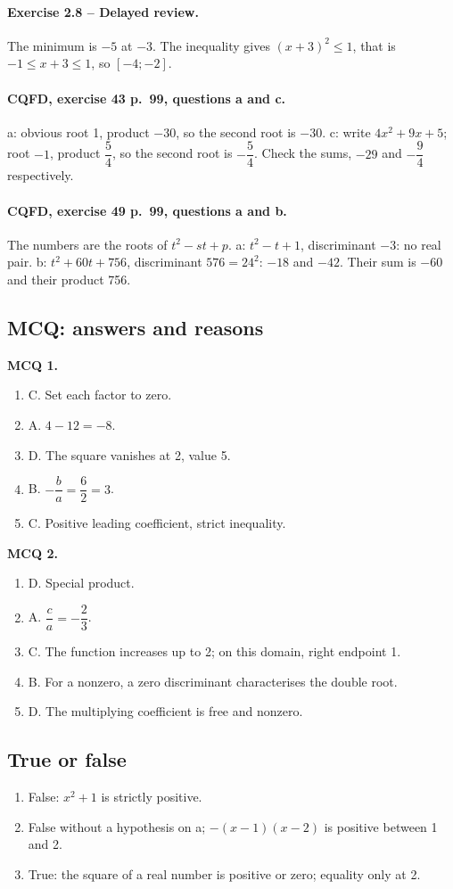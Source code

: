 \paragraph{Exercise 2.8 -- Delayed review.} The minimum is $-5$ at $-3$. The inequality gives $(x+3)^2\leq1$, that is $-1\leq x+3\leq1$, so $[-4;-2]$.
\paragraph{CQFD, exercise 43 p.~99, questions a and c.} a: obvious root 1, product $-30$, so the second root is $-30$. c: write $4x^2+9x+5$; root $-1$, product $\dfrac54$, so the second root is $-\dfrac54$. Check the sums, $-29$ and $-\dfrac94$ respectively.
\paragraph{CQFD, exercise 49 p.~99, questions a and b.} The numbers are the roots of $t^2-st+p$. a: $t^2-t+1$, discriminant $-3$: no real pair. b: $t^2+60t+756$, discriminant $576=24^2$: $-18$ and $-42$. Their sum is $-60$ and their product 756.
\subsection*{MCQ: answers and reasons}
\textbf{MCQ 1.}
\begin{enumerate}
\item C. Set each factor to zero.
\item A. $4-12=-8$.
\item D. The square vanishes at 2, value 5.
\item B. $-\dfrac{b}{a}=\dfrac{6}{2}=3$.
\item C. Positive leading coefficient, strict inequality.
\end{enumerate}
\textbf{MCQ 2.}
\begin{enumerate}
\item D. Special product.
\item A. $\dfrac{c}{a}=-\dfrac{2}{3}$.
\item C. The function increases up to 2; on this domain, right endpoint 1.
\item B. For a nonzero, a zero discriminant characterises the double root.
\item D. The multiplying coefficient is free and nonzero.
\end{enumerate}
\subsection*{True or false}
\begin{enumerate}
\item False: $x^2+1$ is strictly positive.
\item False without a hypothesis on a; $-(x-1)(x-2)$ is positive between 1 and 2.
\item True: the square of a real number is positive or zero; equality only at 2.
\end{enumerate}
